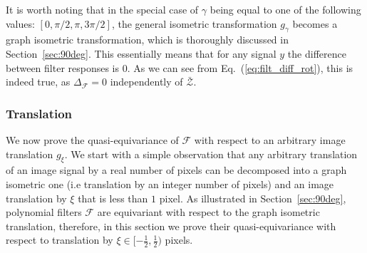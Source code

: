 \documentclass[10pt,journal,compsoc]{IEEEtran}
\newcommand{\renata}[1]{\textcolor{black}{#1}}
\newcommand{\mF}{\mathcal{F}}
\begin{document}
	It is worth noting that in the special case of $\gamma$ being equal to one of the following values: $[0, \pi/2, \pi, 3\pi/2]$, the general isometric transformation $g_\gamma$ becomes a graph isometric transformation, which is thoroughly discussed in Section~\ref{sec:90deg}. This essentially means that for any signal $y$ the difference between filter responses is $0$. As we can see from Eq.~(\ref{eq:filt_diff_rot}), this is indeed true, as $\Delta_\mathcal{F} = 0$ independently of $\bar{\mathcal{Z}}$. 
	
	\subsubsection{Translation}
	\label{sec:trans}
	
	We now prove the quasi-equivariance of $\mathcal{F}$ with respect to an arbitrary image translation $g_\xi$. We start with a simple observation that any arbitrary translation of an image signal by a real number of pixels can be decomposed into a graph isometric one (i.e translation by an integer number of pixels) and an image translation by $\xi$ that is less than $1$ pixel. As illustrated in Section~\ref{sec:90deg}, polynomial filters $\mathcal{F}$ are equivariant with respect to the graph isometric translation, therefore, in this section we prove their quasi-equivariance with respect to translation by $\xi \in [-\frac{1}{2},\frac{1}{2})$ pixels.
	
	
	
\end{document}
